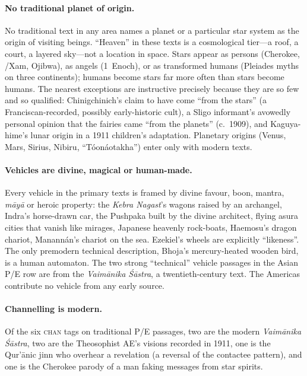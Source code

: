 \documentclass[11pt,a4paper]{article}
\begin{document}
\paragraph{No traditional planet of origin.} No traditional text in any area names a planet or a particular star system as the origin of visiting beings. ``Heaven'' in these texts is a cosmological tier---a roof, a court, a layered sky---not a location in space. Stars appear as persons (Cherokee, /Xam, Ojibwa), as angels (1~Enoch), or as transformed humans (Pleiades myths on three continents); humans become stars far more often than stars become humans. The nearest exceptions are instructive precisely because they are so few and so qualified: Chinigchinich's claim to have come ``from the stars'' (a Franciscan-recorded, possibly early-historic cult), a Sligo informant's avowedly personal opinion that the fairies came ``from the planets'' (c.~1909), and Kaguya-hime's lunar origin in a 1911 children's adaptation. Planetary origins (Venus, Mars, Sirius, Nibiru, ``Tóonáotakha'') enter only with modern texts.

\paragraph{Vehicles are divine, magical or human-made.} Every vehicle in the primary texts is framed by divine favour, boon, mantra, \emph{māyā} or heroic property: the \emph{Kebra Nagast}'s wagons raised by an archangel, Indra's horse-drawn car, the Pushpaka built by the divine architect, flying asura cities that vanish like mirages, Japanese heavenly rock-boats, Haemosu's dragon chariot, Manannán's chariot on the sea. Ezekiel's wheels are explicitly ``likeness''. The only premodern technical description, Bhoja's mercury-heated wooden bird, is a human automaton. The two strong ``technical'' vehicle passages in the Asian P/E row are from the \emph{Vaimānika Śāstra}, a twentieth-century text. The Americas contribute no vehicle from any early source.

\paragraph{Channelling is modern.} Of the six \textsc{chan} tags on traditional P/E passages, two are the modern \emph{Vaimānika Śāstra}, two are the Theosophist AE's visions recorded in 1911, one is the Qur'ānic jinn who overhear a revelation (a reversal of the contactee pattern), and one is the Cherokee parody of a man faking messages from star spirits.
\end{document}
